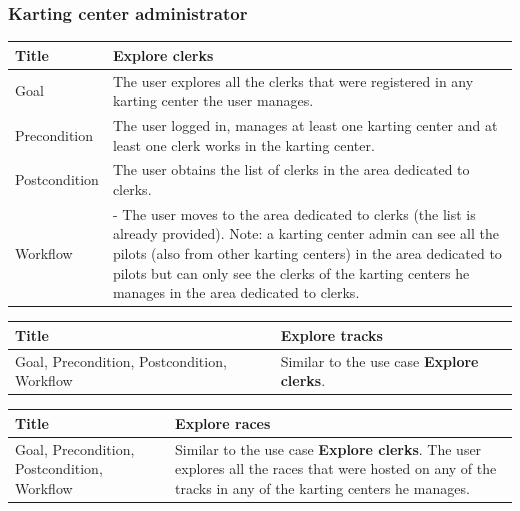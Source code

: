 \documentclass{beamer}
\begin{document}
\begin{frame}
    \frametitle{Karting center administrator}
    \begin{table}
        \tiny
        \begin{tabular}{|p{2cm}|p{6cm}|}
        \hline  
        Title & \textbf{Explore clerks} \\
        \hline
        Goal & The user explores all the clerks that were registered in any karting center the user manages. \\
        \hline
        Precondition & The user logged in, manages at least one karting center and at least one clerk
        works in the karting center.\\
        \hline
        Postcondition & The user obtains the list of clerks in the area dedicated to clerks. \\
        \hline
        Workflow &
        - The user moves to the area dedicated to clerks (the list is already provided).
        Note: a karting center admin can see all the pilots (also from other karting centers) in the
        area dedicated to pilots but can only see the clerks of the karting centers he manages in the
        area dedicated to clerks. \\
        \hline
        \end{tabular}
\end{table}

\begin{table}
    \tiny
    \begin{tabular}{|p{2cm}|p{6cm}|}
    \hline  
    Title & \textbf{Explore tracks} \\
    \hline
    Goal, Precondition, Postcondition, Workflow & Similar to the use case \textbf{Explore clerks}. \\
    \hline
    \end{tabular}
\end{table}

\begin{table}
    \tiny
    \begin{tabular}{|p{2cm}|p{6cm}|}
    \hline  
    Title & \textbf{Explore races} \\
    \hline
    Goal, Precondition, Postcondition, Workflow & Similar to the use case \textbf{Explore clerks}.
    The user explores all the races that were hosted on any of the tracks in any of the karting centers
    he manages.\\
    \hline
    \end{tabular}
\end{table}
\end{frame}
\end{document}
